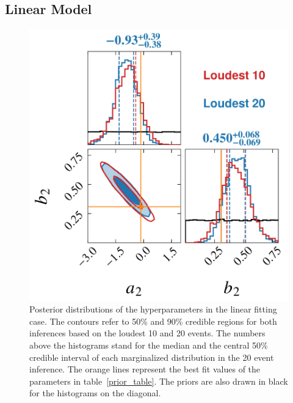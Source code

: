 \documentclass[a4paper,11pt]{article}
\newcommand{\ZW}[1]{\textcolor{magenta}{$\mathcal{ZW}$:~#1}}
\begin{document}
\subsection{Linear Model}
\label{subsec:results_linear_model}
\begin{figure}
    \centering
    \includegraphics[width=0.5\linewidth]{comparison_corner_plot.pdf}
    \caption{Posterior distributions of the hyperparameters in the linear fitting 
    case. The contours refer to 50\% and 90\% credible regions for both inferences 
    based on the loudest 10 and 20 events. The numbers above the histograms stand 
    for the median and the central 50\% credible interval of each marginalized 
    distribution in the 20 event inference. The orange lines represent the best 
    fit values of the parameters in table~\ref{prior_table}. The priors are also 
    drawn in black for the histograms on the diagonal.}
    \label{corner2-d}
\end{figure}
\end{document}

